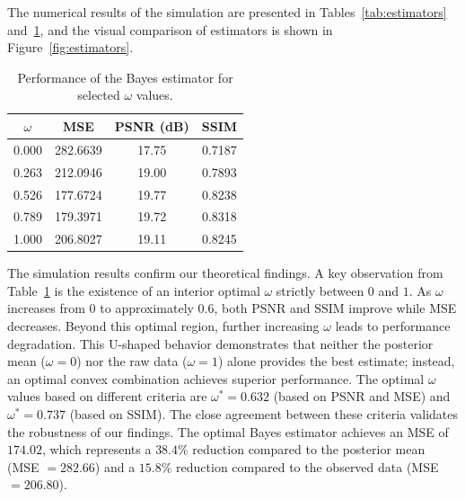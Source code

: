 \documentclass[twoside]{article}
\begin{document}
The numerical results of the simulation are presented in Tables~\ref{tab:estimators} and~\ref{tab:omega_performance}, and the visual comparison of estimators is shown in Figure~\ref{fig:estimators}.
\begin{table}[htbp]
\centering
\caption{Performance of the Bayes estimator for selected $\omega$ values.}
\label{tab:omega_performance}
\begin{tabular}{|c|c|c|c|}
\hline
$\omega$ & \textbf{MSE} & \textbf{PSNR (dB)} & \textbf{SSIM} \\
\hline
0.000 & 282.6639 & 17.75 & 0.7187 \\
0.263 & 212.0946 & 19.00 & 0.7893 \\
0.526 & 177.6724 & 19.77 & 0.8238 \\
0.789 & 179.3971 & 19.72 & 0.8318 \\
1.000 & 206.8027 & 19.11 & 0.8245 \\
\hline
\end{tabular}
\end{table}
The simulation results confirm our theoretical findings. A key observation from Table~\ref{tab:omega_performance} is the existence of an interior optimal $\omega$ strictly between $0$ and $1$. As $\omega$ increases from $0$ to approximately $0.6$, both PSNR and SSIM improve while MSE decreases. Beyond this optimal region, further increasing $\omega$ leads to performance degradation. This U-shaped behavior demonstrates that neither the posterior mean ($\omega = 0$) nor the raw data ($\omega = 1$) alone provides the best estimate; instead, an optimal convex combination achieves superior performance.
The optimal $\omega$ values based on different criteria are $\omega^* = 0.632$ (based on PSNR and MSE) and $\omega^* = 0.737$ (based on SSIM). The close agreement between these criteria validates the robustness of our findings. The optimal Bayes estimator achieves an MSE of $174.02$, which represents a $38.4\%$ reduction compared to the posterior mean (MSE $= 282.66$) and a $15.8\%$ reduction compared to the observed data (MSE $= 206.80$).
\end{document}
